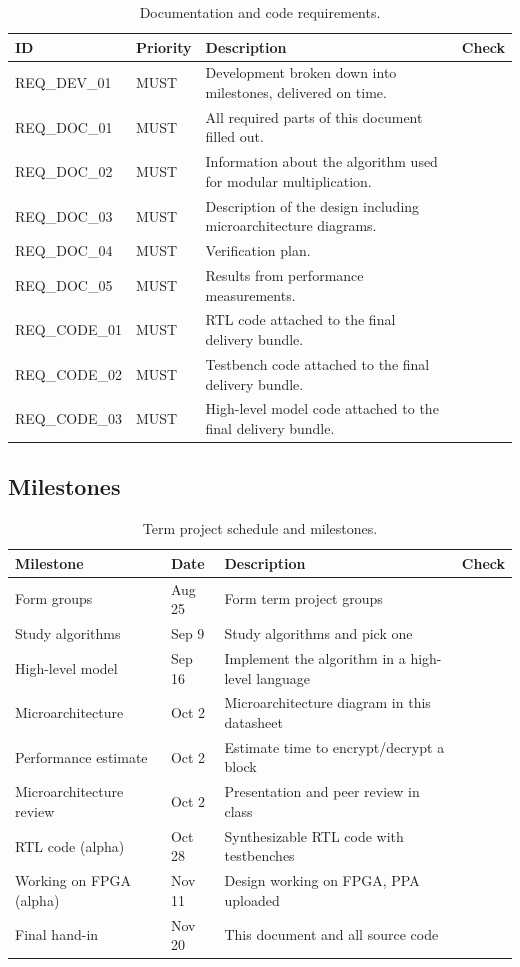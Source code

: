 \begin{table}[H]
\centering
\small
\begin{tabularx}{\textwidth}{l l X c}
\toprule
\textbf{ID} & \textbf{Priority} & \textbf{Description} & \textbf{Check} \\
\midrule
REQ\_DEV\_01 & MUST & Development broken down into milestones, delivered on time. & \\
REQ\_DOC\_01 & MUST & All required parts of this document filled out. & \\
REQ\_DOC\_02 & MUST & Information about the algorithm used for modular multiplication. & \\
REQ\_DOC\_03 & MUST & Description of the design including microarchitecture diagrams. & \\
REQ\_DOC\_04 & MUST & Verification plan. & \\
REQ\_DOC\_05 & MUST & Results from performance measurements. & \\
REQ\_CODE\_01 & MUST & RTL code attached to the final delivery bundle. & \\
REQ\_CODE\_02 & MUST & Testbench code attached to the final delivery bundle. & \\
REQ\_CODE\_03 & MUST & High-level model code attached to the final delivery bundle. & \\
\bottomrule
\end{tabularx}
\caption{Documentation and code requirements.}
\label{tab:doc_req}
\end{table}

\subsection{Milestones}

\begin{table}[H]
\centering
\small
\begin{tabularx}{\textwidth}{l l X c}
\toprule
\textbf{Milestone} & \textbf{Date} & \textbf{Description} & \textbf{Check} \\
\midrule
Form groups & Aug 25 & Form term project groups & \\
Study algorithms & Sep 9 & Study algorithms and pick one & \\
High-level model & Sep 16 & Implement the algorithm in a high-level language & \\
Microarchitecture & Oct 2 & Microarchitecture diagram in this datasheet & \\
Performance estimate & Oct 2 & Estimate time to encrypt/decrypt a block & \\
Microarchitecture review & Oct 2 & Presentation and peer review in class & \\
RTL code (alpha) & Oct 28 & Synthesizable RTL code with testbenches & \\
Working on FPGA (alpha) & Nov 11 & Design working on FPGA, PPA uploaded & \\
Final hand-in & Nov 20 & This document and all source code & \\
\bottomrule
\end{tabularx}
\caption{Term project schedule and milestones.}
\label{tab:milestones}
\end{table}
